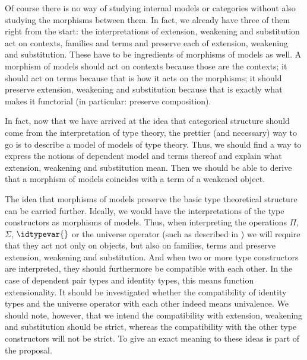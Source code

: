 Of course there is no way of studying internal models or categories without
also studying the morphisms between them. In fact, we already have three of them
right from the start: the interpretations of extension, weakening and substitution
act on contexts, families and terms and preserve each of extension, weakening and
substitution. These have to be ingredients of morphisms of models as well. A
morphism of models should act on contexts because those are the contexts; it
should act on terms because that is how it acts on the morphisms; it should
preserve extension, weakening and substitution because that is exactly what
makes it functorial (in particular: preserve composition).

In fact, now that we have arrived at the idea that categorical structure should
come from the interpretation of type theory, the prettier (and necessary) way to go is to
describe a model of models of type theory. Thus, we should find a way to express
the notions of dependent model and terms thereof and explain what extension,
weakening and substitution mean. Then we should be able to derive that a morphism
of models coincides with a term of a weakened object.

The idea that morphisms of models preserve the basic type theoretical structure
can be carried further. Ideally, we would have the interpretations of the type
constructors as morphisms of models. Thus, when interpreting the operations 
$\Pi$, $\Sigma$, $\idtypevar{}$ or the universe operator 
(such as described in \cite{Palmgren1998}) we will require that
they act not only on objects, but also on families, terms and preserve extension,
weakening and substitution. And when two or more type constructors are interpreted,
they should furthermore be compatible with each other. In the case of
dependent pair types and identity types, this means function extensionality. It
should be investigated whether the compatibility of identity types and the
universe operator with each other indeed means univalence. We should note,
however, that we intend the compatibility with extension, weakening and substitution
should be strict, whereas the compatibility with the other type constructors will
not be strict. To give an exact meaning to these ideas is part of the proposal.

